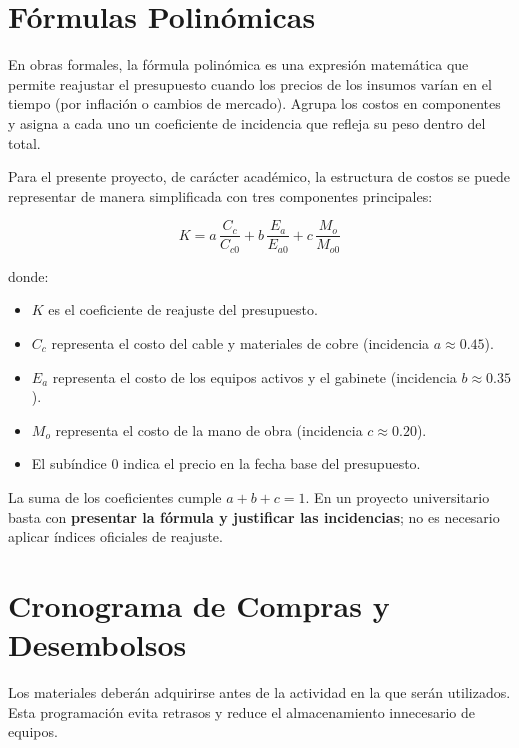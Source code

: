 \section{Fórmulas Polinómicas}
En obras formales, la fórmula polinómica es una expresión matemática que permite reajustar el presupuesto cuando los precios de los insumos varían en el tiempo (por inflación o cambios de mercado). Agrupa los costos en componentes y asigna a cada uno un coeficiente de incidencia que refleja su peso dentro del total.

Para el presente proyecto, de carácter académico, la estructura de costos se puede representar de manera simplificada con tres componentes principales:

\[
K = a\,\frac{C_c}{C_{c0}} + b\,\frac{E_a}{E_{a0}} + c\,\frac{M_o}{M_{o0}}
\]

\noindent donde:
\begin{itemize}[label=$\bullet$,leftmargin=1.4em]
    \item $K$ es el coeficiente de reajuste del presupuesto.
    \item $C_c$ representa el costo del cable y materiales de cobre (incidencia $a \approx 0.45$).
    \item $E_a$ representa el costo de los equipos activos y el gabinete (incidencia $b \approx 0.35$).
    \item $M_o$ representa el costo de la mano de obra (incidencia $c \approx 0.20$).
    \item El subíndice $0$ indica el precio en la fecha base del presupuesto.
\end{itemize}

\noindent La suma de los coeficientes cumple $a + b + c = 1$. En un proyecto universitario basta con \textbf{presentar la fórmula y justificar las incidencias}; no es necesario aplicar índices oficiales de reajuste.

\section{Cronograma de Compras y Desembolsos}

Los materiales deberán adquirirse antes de la actividad en la que serán utilizados. Esta programación evita retrasos y reduce el almacenamiento innecesario de equipos.

